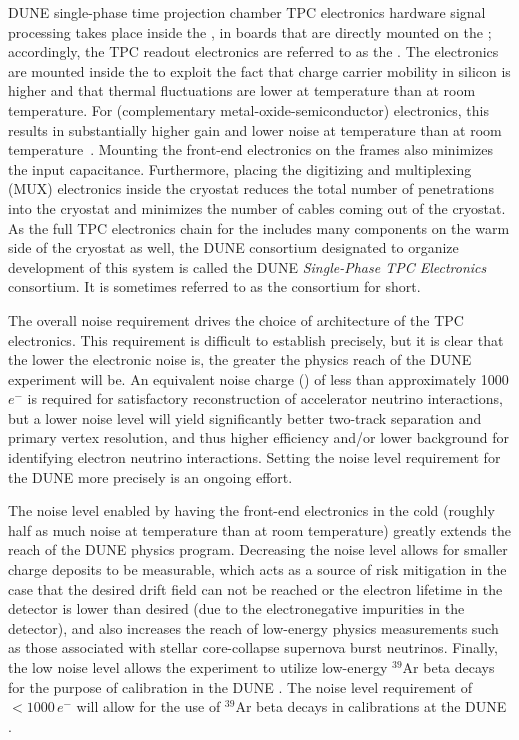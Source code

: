 DUNE single-phase time projection chamber TPC electronics hardware signal processing takes place inside the \lar, in boards that are directly mounted on the ; accordingly, the TPC readout electronics are referred to as the .  The electronics are mounted inside the \lar to exploit the fact that charge carrier mobility in silicon is higher and that thermal fluctuations are lower at \lar temperature than at room temperature.  For  (complementary metal-oxide-semiconductor) electronics, this results in substantially higher gain and lower noise at \lar temperature than at room temperature~\cite{larCMOS}.  Mounting the front-end electronics on the  frames also minimizes the input capacitance.  Furthermore, placing the digitizing and multiplexing (MUX) electronics inside the cryostat reduces the total number of penetrations into the cryostat and minimizes the number of cables coming out of the cryostat.  As the full TPC electronics chain for the  includes many components on the warm side of the cryostat as well, the DUNE consortium designated to organize development of this system is called the DUNE \textit{Single-Phase TPC Electronics} consortium. It is sometimes referred to as the  consortium for short.


The overall noise requirement drives the choice of architecture of the TPC electronics. This requirement is difficult to establish precisely, but it is clear that the lower the electronic noise is, the greater the physics reach of the DUNE experiment will be.  An equivalent noise charge () of less than approximately 1000$e^-$ is required for satisfactory reconstruction of accelerator neutrino interactions, but a lower noise level will yield significantly better two-track separation and primary vertex resolution, and thus higher efficiency and/or lower background for identifying electron neutrino interactions.  Setting the noise level requirement for the DUNE  more precisely is an ongoing effort.

The noise level enabled by having the front-end electronics in the cold (roughly half as much noise at \lar temperature than at room temperature) greatly extends the reach of the DUNE physics program.  Decreasing the noise level allows for smaller charge deposits to be measurable, which acts as a source of risk mitigation in the case that the desired drift field can not be reached or the electron lifetime in the detector is lower than desired (due to the electronegative impurities in the detector), and also increases the reach of low-energy physics measurements such as those associated with stellar core-collapse supernova burst neutrinos.  Finally, the low noise level allows the experiment to utilize low-energy $\mathrm{{}^{39}Ar}$ beta decays for the purpose of calibration in the DUNE .  The noise level requirement of \,$<\num{1000}\,e^-$ will allow for the use of $\mathrm{{}^{39}Ar}$ beta decays in calibrations at the DUNE .

